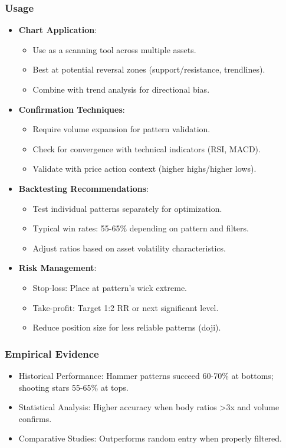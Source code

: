 \documentclass[12pt]{article}
\begin{document}
\subsubsection{Usage}
\begin{itemize}
\item \textbf{Chart Application}:
  \begin{itemize}
  \item Use as a scanning tool across multiple assets.
  \item Best at potential reversal zones (support/resistance, trendlines).
  \item Combine with trend analysis for directional bias.
  \end{itemize}
\item \textbf{Confirmation Techniques}:
  \begin{itemize}
  \item Require volume expansion for pattern validation.
  \item Check for convergence with technical indicators (RSI, MACD).
  \item Validate with price action context (higher highs/higher lows).
  \end{itemize}
\item \textbf{Backtesting Recommendations}:
  \begin{itemize}
  \item Test individual patterns separately for optimization.
  \item Typical win rates: 55-65\% depending on pattern and filters.
  \item Adjust ratios based on asset volatility characteristics.
  \end{itemize}
\item \textbf{Risk Management}:
  \begin{itemize}
  \item Stop-loss: Place at pattern's wick extreme.
  \item Take-profit: Target 1:2 RR or next significant level.
  \item Reduce position size for less reliable patterns (doji).
  \end{itemize}
\end{itemize}

\subsubsection{Empirical Evidence}
\begin{itemize}
\item Historical Performance: Hammer patterns succeed 60-70\% at bottoms; shooting stars 55-65\% at tops.
\item Statistical Analysis: Higher accuracy when body ratios >3x and volume confirms.
\item Comparative Studies: Outperforms random entry when properly filtered.
\end{itemize}
\end{document}
